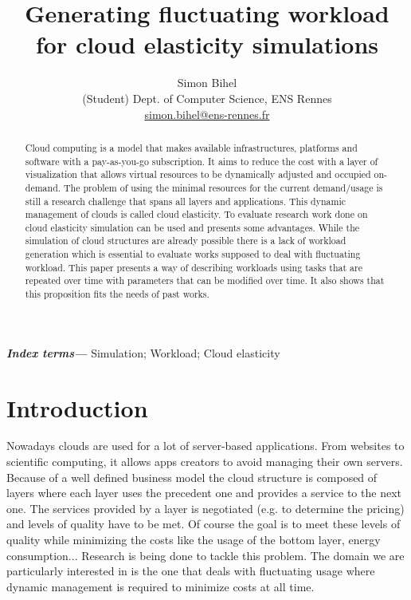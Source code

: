 \documentclass[a4paper, onecolumn]{article}
\title{Generating fluctuating workload for cloud elasticity simulations}
\author{Simon Bihel \\ (Student) Dept. of Computer Science, ENS Rennes\\
  \href{mailto:simon.bihel@ens-rennes.fr}{simon.bihel@ens-rennes.fr}}
\begin{document}
\maketitle

\begin{abstract}
  Cloud computing is a model that makes available infrastructures, platforms and
  software with a pay-as-you-go subscription. It aims to reduce the cost with a
  layer of visualization that allows virtual resources to be dynamically
  adjusted and occupied on-demand. The problem of using the minimal resources
  for the current demand/usage is still a research challenge that spans all
  layers and applications. This dynamic management of clouds is called cloud
  elasticity. To evaluate research work done on cloud elasticity simulation can 
  be used and presents some advantages. While the simulation of cloud 
  structures are already possible there is a lack of workload generation which 
  is essential to evaluate works supposed to deal with fluctuating workload. 
  This paper presents a way of describing workloads using tasks that are 
  repeated over time with parameters that can be modified over time. It also 
  shows that this proposition fits the needs of past works.
\end{abstract}

\providecommand{\keywords}[1]{\textbf{\textit{Index terms---}} #1}
\keywords{Simulation; Workload; Cloud elasticity}

\section{Introduction} \label{intro}
  Nowadays clouds are used for a lot of server-based applications. From websites
  to scientific computing, it allows apps creators to avoid managing their own
  servers. Because of a well defined business model the cloud structure is
  composed of layers where each layer uses the precedent one and provides a
  service to the next one. The services provided by a layer is negotiated (e.g.
  to determine the pricing) and levels of quality have to be met. Of course the
  goal is to meet these levels of quality while minimizing the costs like the
  usage of the bottom layer, energy consumption... Research is being done to
  tackle this problem. The domain we are particularly interested in is the one
  that deals with fluctuating usage where dynamic management is required to
  minimize costs at all time.
  
\end{document}
